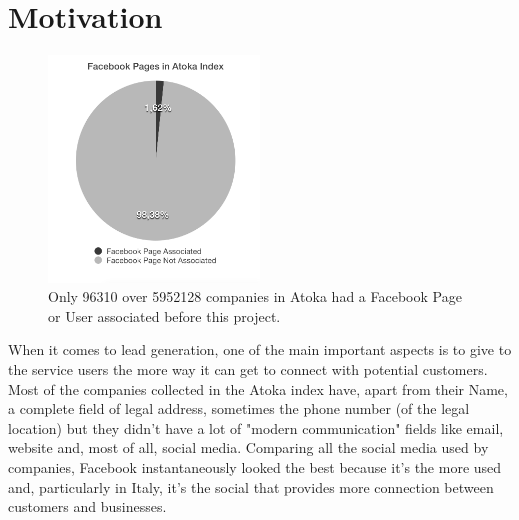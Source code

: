 \chapter{Motivation} 

\begin{figure}
\centering
\includegraphics[width=0.5\textwidth]{img/facebook_atoka_bw.png}
\caption{Only 96310 over 5952128 companies in Atoka had a Facebook Page or User associated before this project.}
\label{Fig.1}
\end{figure}


When it comes to lead generation, one of the main important aspects is to give to the service users the more way it can get to connect with potential customers. Most of the companies collected in the Atoka index have, apart from their Name, a complete field of legal address, sometimes the phone number (of the legal location) but they didn't have a lot of "modern communication" fields like email, website and, most of all, social media. Comparing all the social media used by companies, Facebook instantaneously looked the best because it's the more used and, particularly in Italy, it's the social that provides more connection between customers and businesses.
 
